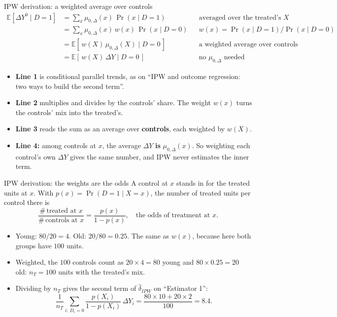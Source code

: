 \documentclass[
  11pt,
  ignorenonframetext,
  aspectratio=169,
]{beamer}
\providecommand{\tightlist}{%
  \setlength{\itemsep}{0pt}\setlength{\parskip}{0pt}}
\begin{document}
\begin{frame}{IPW derivation: a weighted average over controls}
\protect{}\label{ipw-derivation-a-weighted-average-over-controls}
\[
\begin{aligned}
\mathbb{E}[\Delta Y^0 \mid D=1] &= \textstyle\sum_x \mu_{0,\Delta}(x)\,\Pr(x \mid D=1) && \text{averaged over the treated's } X \\
&= \textstyle\sum_x \mu_{0,\Delta}(x)\, w(x)\, \Pr(x \mid D=0) && w(x) = \Pr(x \mid D=1)/\Pr(x \mid D=0) \\
&= \mathbb{E}[\, w(X)\, \mu_{0,\Delta}(X) \mid D=0 \,] && \text{a weighted average over controls} \\
&= \mathbb{E}[\, w(X)\, \Delta Y \mid D=0 \,] && \text{no } \mu_{0,\Delta} \text{ needed}
\end{aligned}
\]

\begin{itemize}
\tightlist
\item
  \textbf{Line 1} is conditional parallel trends, as on ``IPW and
  outcome regression: two ways to build the second term''.
\item
  \textbf{Line 2} multiplies and divides by the controls' share. The
  weight \(w(x)\) turns the controls' mix into the treated's.
\item
  \textbf{Line 3} reads the sum as an average over \textbf{controls},
  each weighted by \(w(X)\).
\item
  \textbf{Line 4:} among controls at \(x\), the average \(\Delta Y\)
  \textbf{is} \(\mu_{0,\Delta}(x)\). So weighting each control's own
  \(\Delta Y\) gives the same number, and IPW never estimates the inner
  term.
\end{itemize}
\end{frame}

\begin{frame}{IPW derivation: the weights are the odds}
\protect{}\label{ipw-derivation-the-weights-are-the-odds}
A control at \(x\) stands in for the treated units at \(x\). With
\(p(x) = \Pr(D=1 \mid X=x)\), the number of treated units per control
there is \[
\frac{\#\,\text{treated at } x}{\#\,\text{controls at } x} = \frac{p(x)}{1 - p(x)}, \quad \text{the odds of treatment at } x .
\]

\begin{itemize}
\tightlist
\item
  Young: \(80/20 = 4\). Old: \(20/80 = 0.25\). The same as \(w(x)\),
  because here both groups have \(100\) units.
\item
  Weighted, the \(100\) controls count as \(20 \times 4 = 80\) young and
  \(80 \times 0.25 = 20\) old: \(n_T = 100\) units with the treated's
  mix.
\item
  Dividing by \(n_T\) gives the second term of \(\hat\delta_{IPW}\) on
  ``Estimator 1'': \[
  \frac{1}{n_T}\sum_{i:\,D_i=0} \frac{p(X_i)}{1-p(X_i)}\,\Delta Y_i = \frac{80 \times 10 + 20 \times 2}{100} = 8.4 .
  \]
\end{itemize}
\end{frame}
\end{document}
